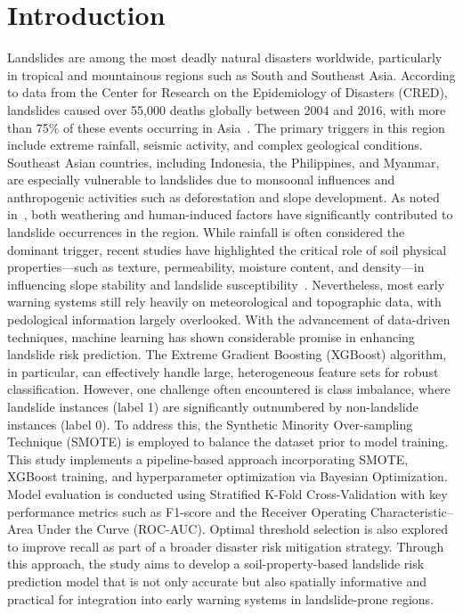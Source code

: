 \section{Introduction}

Landslides are among the most deadly natural disasters worldwide, particularly in tropical and mountainous regions such as South and Southeast Asia. According to data from the Center for Research on the Epidemiology of Disasters (CRED), landslides caused over 55,000 deaths globally between 2004 and 2016, with more than 75\% of these events occurring in Asia~\cite{intro01}. The primary triggers in this region include extreme rainfall, seismic activity, and complex geological conditions.
Southeast Asian countries, including Indonesia, the Philippines, and Myanmar, are especially vulnerable to landslides due to monsoonal influences and anthropogenic activities such as deforestation and slope development. As noted in~\cite{intro02}, both weathering and human-induced factors have significantly contributed to landslide occurrences in the region.
While rainfall is often considered the dominant trigger, recent studies have highlighted the critical role of soil physical properties—such as texture, permeability, moisture content, and density—in influencing slope stability and landslide susceptibility~\cite{intro03}. Nevertheless, most early warning systems still rely heavily on meteorological and topographic data, with pedological information largely overlooked.
With the advancement of data-driven techniques, machine learning has shown considerable promise in enhancing landslide risk prediction. The Extreme Gradient Boosting (XGBoost) algorithm, in particular, can effectively handle large, heterogeneous feature sets for robust classification. However, one challenge often encountered is class imbalance, where landslide instances (label 1) are significantly outnumbered by non-landslide instances (label 0). To address this, the Synthetic Minority Over-sampling Technique (SMOTE) is employed to balance the dataset prior to model training.
This study implements a pipeline-based approach incorporating SMOTE, XGBoost training, and hyperparameter optimization via Bayesian Optimization. Model evaluation is conducted using Stratified K-Fold Cross-Validation with key performance metrics such as F1-score and the Receiver Operating Characteristic–Area Under the Curve (ROC-AUC). Optimal threshold selection is also explored to improve recall as part of a broader disaster risk mitigation strategy.
Through this approach, the study aims to develop a soil-property-based landslide risk prediction model that is not only accurate but also spatially informative and practical for integration into early warning systems in landslide-prone regions.
